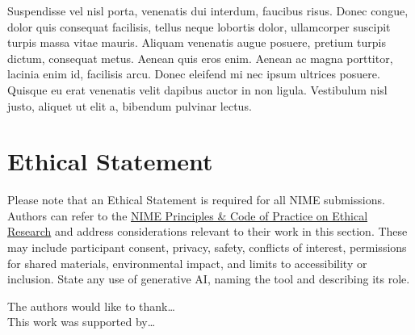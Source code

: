 \documentclass[acmsmall]{nimeart}
\begin{document}
Suspendisse vel nisl porta, venenatis dui interdum, faucibus risus. Donec congue, dolor quis consequat facilisis, tellus neque lobortis dolor, ullamcorper suscipit turpis massa vitae mauris. Aliquam venenatis augue posuere, pretium turpis dictum, consequat metus. Aenean quis eros enim. Aenean ac magna porttitor, lacinia enim id, facilisis arcu. Donec eleifend mi nec ipsum ultrices posuere. Quisque eu erat venenatis velit dapibus auctor in non ligula. Vestibulum nisl justo, aliquet ut elit a, bibendum pulvinar lectus.


\section{Ethical Statement}

Please note that an Ethical Statement is required for all NIME submissions. Authors can refer to the \href{https://nime.org/ethics/}{NIME Principles \& Code of Practice on Ethical Research} and address considerations relevant to their work in this section. These may include participant consent, privacy, safety, conflicts of interest, permissions for shared materials, environmental impact, and limits to accessibility or inclusion. State any use of generative AI, naming the tool and describing its role.

\begin{acks}
The authors would like to thank\ldots
\\
This work was supported by\ldots
\end{acks}



\end{document}
